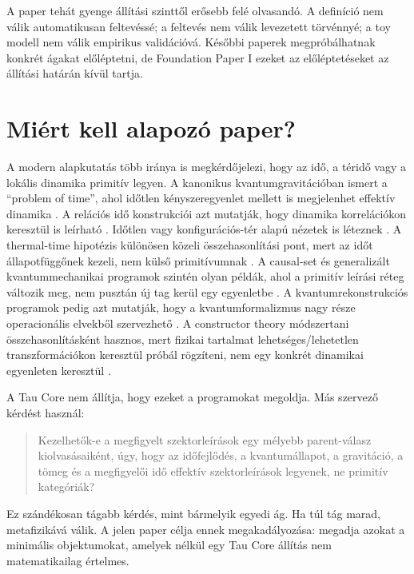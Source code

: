 \documentclass[12pt]{article}
\begin{document}
A paper tehát gyenge állítási szinttől erősebb felé olvasandó.  A definíció nem
válik automatikusan feltevéssé; a feltevés nem válik levezetett törvénnyé; a
toy modell nem válik empirikus validációvá.  Későbbi paperek megpróbálhatnak
konkrét ágakat előléptetni, de Foundation Paper I ezeket az előléptetéseket
az állítási határán kívül tartja.

\section{Miért kell alapozó paper?}

A modern alapkutatás több iránya is megkérdőjelezi, hogy az idő, a téridő vagy
a lokális dinamika primitív legyen.  A kanonikus kvantumgravitációban ismert a
``problem of time'', ahol időtlen kényszeregyenlet mellett is megjelenhet
effektív dinamika \cite{WheelerDeWitt1967,Rovelli2004}.  A relációs idő
konstrukciói azt mutatják, hogy dinamika korrelációkon keresztül is leírható
\cite{PageWootters1983}.  Időtlen vagy konfigurációs-tér alapú nézetek is
léteznek \cite{Barbour1999}.  A thermal-time hipotézis különösen közeli
összehasonlítási pont, mert az időt állapotfüggőnek kezeli, nem külső
primitívumnak \cite{ConnesRovelli1994}.  A causal-set és generalizált
kvantummechanikai programok szintén olyan példák, ahol a primitív leírási
réteg változik meg, nem pusztán új tag kerül egy egyenletbe
\cite{Bombelli1987,Hartle1991}.  A kvantumrekonstrukciós programok pedig azt
mutatják, hogy a kvantumformalizmus nagy része operacionális elvekből
szervezhető \cite{Hardy2001,Chiribella2011,MasanesMueller2011}.  A constructor
theory módszertani összehasonlításként hasznos, mert fizikai tartalmat
lehetséges/lehetetlen transzformációkon keresztül próbál rögzíteni, nem egy
konkrét dinamikai egyenleten keresztül \cite{Deutsch2013,DeutschMarletto2015}.

A Tau Core nem állítja, hogy ezeket a programokat megoldja.  Más szervező
kérdést használ:
\begin{quote}
Kezelhetők-e a megfigyelt szektorleírások egy mélyebb parent-válasz
kiolvasásaiként, úgy, hogy az időfejlődés, a kvantumállapot, a gravitáció, a
tömeg és a megfigyelői idő effektív szektorleírások legyenek, ne primitív
kategóriák?
\end{quote}
Ez szándékosan tágabb kérdés, mint bármelyik egyedi ág.  Ha túl tág marad,
metafizikává válik.  A jelen paper célja ennek megakadályozása: megadja azokat
a minimális objektumokat, amelyek nélkül egy Tau Core állítás nem matematikailag
értelmes.
\end{document}
